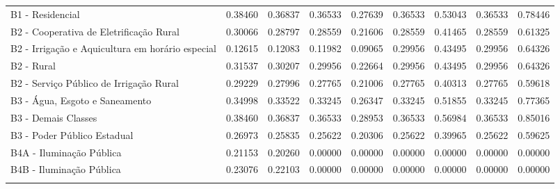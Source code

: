 \documentclass[grad,numbers]{coppe}
\begin{document}
\begin{longtable}[t]{>{\centering\arraybackslash}p{8em}cccccccc}
  B1 - Residencial & 0.38460 & 0.36837 & 0.36533 & 0.27639 & 0.36533 & 0.53043 & 0.36533 & 0.78446\\
  \addlinespace
  B2 - Cooperativa de Eletrificação Rural & 0.30066 & 0.28797 & 0.28559 & 0.21606 & 0.28559 & 0.41465 & 0.28559 & 0.61325\\
  B2 - Irrigação e Aquicultura em horário especial & 0.12615 & 0.12083 & 0.11982 & 0.09065 & 0.29956 & 0.43495 & 0.29956 & 0.64326\\
  B2 - Rural & 0.31537 & 0.30207 & 0.29956 & 0.22664 & 0.29956 & 0.43495 & 0.29956 & 0.64326\\
  B2 - Serviço Público de Irrigação Rural & 0.29229 & 0.27996 & 0.27765 & 0.21006 & 0.27765 & 0.40313 & 0.27765 & 0.59618\\
  B3 - Água, Esgoto e Saneamento & 0.34998 & 0.33522 & 0.33245 & 0.26347 & 0.33245 & 0.51855 & 0.33245 & 0.77365\\
  \addlinespace
  B3 - Demais Classes & 0.38460 & 0.36837 & 0.36533 & 0.28953 & 0.36533 & 0.56984 & 0.36533 & 0.85016\\
  B3 - Poder Público Estadual & 0.26973 & 0.25835 & 0.25622 & 0.20306 & 0.25622 & 0.39965 & 0.25622 & 0.59625\\
  B4A - Iluminação Pública & 0.21153 & 0.20260 & 0.00000 & 0.00000 & 0.00000 & 0.00000 & 0.00000 & 0.00000\\
  B4B - Iluminação Pública & 0.23076 & 0.22103 & 0.00000 & 0.00000 & 0.00000 & 0.00000 & 0.00000 & 0.00000\\*
  \end{longtable}
  \endgroup{}
\end{document}
